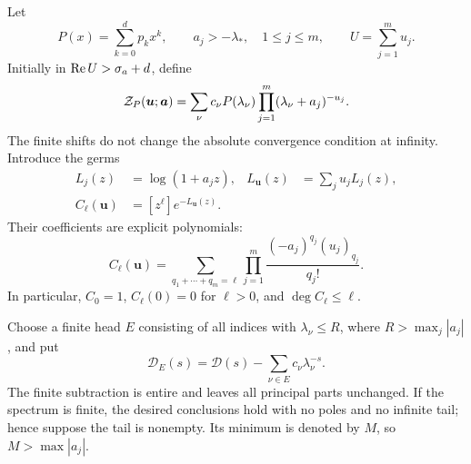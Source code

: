 \documentclass[11pt]{article}
\numberwithin{equation}{section}
\theoremstyle{definition}\newtheorem{definition}[theorem]{Definition}
\theoremstyle{remark}\newtheorem{remark}[theorem]{Remark}\newtheorem{example}[theorem]{Example}
\newcommand{\D}{\mathscr D}\newcommand{\calH}{\mathcal H}\newcommand{\calR}{\mathcal R}
\begin{document}
Let
\[
 P(x)=\sum_{k=0}^{d}p_kx^k,
 \qquad a_j> -\lambda_*,\quad 1\le j\le m,
 \qquad U=\sum_{j=1}^m u_j.
\]
Initially in $\operatorname{Re} U>\sigma_a+d$, define
\begin{equation}\label{asj:eq:Zdef}
 \mathcal Z_P(\boldsymbol u;\boldsymbol a)
 =\sum_\nu c_\nu P(\lambda_\nu)
                   \prod_{j=1}^m(\lambda_\nu+a_j)^{-u_j}.
\end{equation}
The finite shifts do not change the absolute convergence condition at infinity.
Introduce the germs
\begin{align}
 L_j(z)&=\log(1+a_jz),&
 L_{\boldsymbol u}(z)&=\sum_j u_j L_j(z),\label{asj:eq:Ldef}\\
 C_\ell(\boldsymbol u)&=[z^\ell]e^{-L_{\boldsymbol u}(z)}.
 \label{asj:eq:Cdef}
\end{align}
Their coefficients are explicit polynomials:
\begin{equation}\label{asj:eq:Cpoch}
 C_\ell(\boldsymbol u)=
 \sum_{q_1+\cdots+q_m=\ell}
    \prod_{j=1}^m\frac{(-a_j)^{q_j}(u_j)_{q_j}}{q_j!}.
\end{equation}
In particular, $C_0=1$, $C_\ell(0)=0$ for $\ell>0$, and
$\deg C_\ell\le\ell$.

Choose a finite head $E$ consisting of all indices with $\lambda_\nu\le R$,
where $R>\max_j|a_j|$, and put
\[
 \D_E(s)=\D(s)-\sum_{\nu\in E}c_\nu\lambda_\nu^{-s}.
\]
The finite subtraction is entire and leaves all principal parts unchanged.
If the spectrum is finite, the desired conclusions hold with no poles and
no infinite tail; hence suppose the tail is nonempty. Its minimum is denoted
by $M$, so $M>\max|a_j|$.
\end{document}
